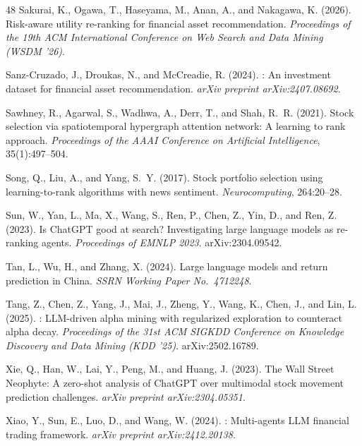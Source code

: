 {\begin{thebibliography}{48}
Sakurai, K., Ogawa, T., Haseyama, M., Anan, A., and Nakagawa, K. (2026).
\newblock Risk-aware utility re-ranking for financial asset recommendation.
\newblock \emph{Proceedings of the 19th ACM International Conference on Web Search and Data Mining (WSDM '26)}.

Sanz-Cruzado, J., Droukas, N., and McCreadie, R. (2024).
: An investment dataset for financial asset recommendation.
\newblock \emph{arXiv preprint arXiv:2407.08692}.

Sawhney, R., Agarwal, S., Wadhwa, A., Derr, T., and Shah, R.~R. (2021).
\newblock Stock selection via spatiotemporal hypergraph attention network: A learning to rank approach.
\newblock \emph{Proceedings of the AAAI Conference on Artificial Intelligence}, 35(1):497--504.

Song, Q., Liu, A., and Yang, S.~Y. (2017).
\newblock Stock portfolio selection using learning-to-rank algorithms with news sentiment.
\newblock \emph{Neurocomputing}, 264:20--28.

Sun, W., Yan, L., Ma, X., Wang, S., Ren, P., Chen, Z., Yin, D., and Ren, Z. (2023).
\newblock Is {ChatGPT} good at search? Investigating large language models as re-ranking agents.
\newblock \emph{Proceedings of EMNLP 2023}. arXiv:2304.09542.

Tan, L., Wu, H., and Zhang, X. (2024).
\newblock Large language models and return prediction in {China}.
\newblock \emph{SSRN Working Paper No.\ 4712248}.

Tang, Z., Chen, Z., Yang, J., Mai, J., Zheng, Y., Wang, K., Chen, J., and Lin, L. (2025).
: {LLM}-driven alpha mining with regularized exploration to counteract alpha decay.
\newblock \emph{Proceedings of the 31st ACM SIGKDD Conference on Knowledge Discovery and Data Mining (KDD '25)}. arXiv:2502.16789.

Xie, Q., Han, W., Lai, Y., Peng, M., and Huang, J. (2023).
\newblock The {W}all {S}treet {N}eophyte: A zero-shot analysis of {ChatGPT} over multimodal stock movement prediction challenges.
\newblock \emph{arXiv preprint arXiv:2304.05351}.

Xiao, Y., Sun, E., Luo, D., and Wang, W. (2024).
: Multi-agents {LLM} financial trading framework.
\newblock \emph{arXiv preprint arXiv:2412.20138}.


\end{thebibliography}}
